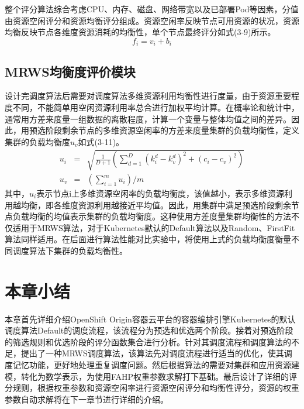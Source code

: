 整个评分算法综合考虑CPU、内存、磁盘、网络带宽以及已部署Pod等因素，分值由资源空闲评分和资源均衡评分组成。资源空闲率反映节点可用资源的状况，资源均衡反映节点各维度资源消耗的均衡性，单个节点最终评分如式(3-9)所示。
\begin{equation}
f_{i} = v_{i}+b_{i}
\end{equation}

\subsection{MRWS均衡度评价模块}
设计完调度算法后需要对调度算法多维资源利用均衡性进行度量，由于资源重要程度不同，不能简单用空闲资源利用率总合进行加权平均计算。在概率论和统计中，通常用方差来度量一组数据的离散程度，计算一个变量与整体均值之间的差异。因此，用预选阶段剩余节点的多维资源空闲率的方差来度量集群的负载均衡性，定义集群的负载均衡度$u_{v}$如式(3-11)。
\begin{eqnarray}
	u_{i} &=& \sqrt{\frac{1}{D+1}(\sum_{d=1}^{D}(k_{i}^{d}-k_{v}^{d})^{2}+(c_{i}-c_{v})^{2})} \\[0.3cm]
	u_{v} &=& (\sum_{i=1}^{m}u_{i})/m
\end{eqnarray}
其中，\begin{math}u_{i}\end{math}表示节点i上多维资源空闲率的负载均衡度，该值越小，表示多维资源利用越均衡，即各维度资源利用越接近平均值。因此，用集群中满足预选阶段剩余节点负载均衡的均值表示集群的负载均衡度。这种使用方差度量集群均衡性的方法不仅适用于MRWS算法，对于Kubernetes默认的Default算法以及Random、FirstFit算法同样适用。在后面进行算法性能对比实验中，将使用上式的负载均衡度衡量不同调度算法下集群的负载均衡性。

\section{本章小结}
本章首先详细介绍OpenShift Origin容器云平台的容器编排引擎Kubernetes的默认调度算法Default的调度流程，该流程分为预选和优选两个阶段。接着对预选阶段的筛选规则和优选阶段的评分函数集合进行分析。针对其调度流程和调度算法的不足，提出了一种MRWS调度算法，该算法先对调度流程进行适当的优化，使其调度记忆功能，更好地处理重复调度问题。然后根据算法的需要对集群和应用资源建模，转化为数学表示，为使用FAHP权重参数求解打下基础。最后设计了详细的评分规则，根据权重参数和资源空闲率进行资源空闲评分和均衡性评分，资源的权重参数自动求解将在下一章节进行详细的介绍。




